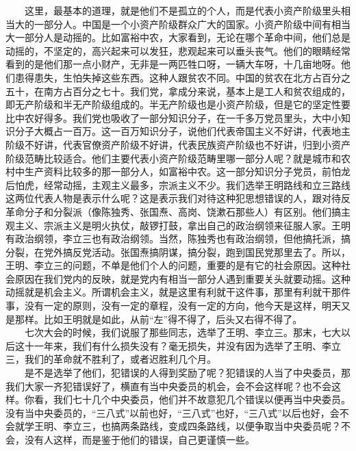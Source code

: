 \documentclass[cn,11pt,chinese]{elegantbook}
\begin{document}
　　这里，最基本的道理，就是他们不是孤立的个人，而是代表小资产阶级里头相当大的一部分人。中国是一个小资产阶级群众广大的国家。小资产阶级中间有相当大一部分人是动摇的。比如富裕中农，大家看到，无论在哪个革命中间，他们总是动摇的，不坚定的，高兴起来可以发狂，悲观起来可以垂头丧气。他们的眼睛经常看到的是他们那一点小财产，无非是一两匹牲口呀，一辆大车呀，十几亩地呀。他们患得患失，生怕失掉这些东西。这种人跟贫农不同。中国的贫农在北方占百分之五十，在南方占百分之七十。我们党，拿成分来说，基本上是工人和贫农组成的，即无产阶级和半无产阶级组成的。半无产阶级也是小资产阶级，但是它的坚定性要比中农好得多。我们党也吸收了一部分知识分子，在一千多万党员里头，大中小知识分子大概占一百万。这一百万知识分子，说他们代表帝国主义不好讲，代表地主阶级不好讲，代表官僚资产阶级不好讲，代表民族资产阶级也不好讲，归到小资产阶级范畴比较适合。他们主要代表小资产阶级范畴里哪一部分人呢？就是城市和农村中生产资料比较多的那一部分人，如富裕中农。这一部分知识分子党员，前怕龙后怕虎，经常动摇，主观主义最多，宗派主义不少。我们选举王明路线和立三路线这两位代表人物是表示什么呢？这是表示我们对待这种犯思想错误的人，跟对待反革命分子和分裂派（像陈独秀、张国焘、高岗、饶漱石那些人）有区别。他们搞主观主义、宗派主义是明火执仗，敲锣打鼓，拿出自己的政治纲领来征服人家。王明有政治纲领，李立三也有政治纲领。当然，陈独秀也有政治纲领，但他搞托派，搞分裂，在党外搞反党活动。张国焘搞阴谋，搞分裂，跑到国民党那里去了。所以，王明、李立三的问题，不单是他们个人的问题，重要的是有它的社会原因。这种社会原因在我们党内的反映，就是党内有相当一部分人遇到重要关头就要动摇。这种动摇就是机会主义。所谓机会主义，就是这里有利就干这件事，那里有利就干那件事，没有一定的原则，没有一定的章程，没有一定的方向，他今天是这样，明天又是那样。比如王明就是如此，从前“左”得不得了，后头又右得不得了。\\
　　七次大会的时候，我们说服了那些同志，选举了王明、李立三。那末，七大以后这十一年来，我们有什么损失没有？毫无损失，并没有因为选举了王明、李立三，我们的革命就不胜利了，或者迟胜利几个月。\\
　　是不是选举了他们，犯错误的人得到奖励了呢？犯错误的人当了中央委员，那我们大家一齐犯错误好了，横直有当中央委员的机会，会不会这样呢？也不会这样。你看，我们七十几个中央委员，他们并不故意犯几个错误以便再当中央委员。没有当中央委员的，“三八式”以前也好，“三八式”也好，“三八式”以后也好，会不会就学王明、李立三，也搞两条路线，变成四条路线，以便争取当中央委员呢？不会，没有人这样，而是鉴于他们的错误，自己更谨慎一些。\\
\end{document}
